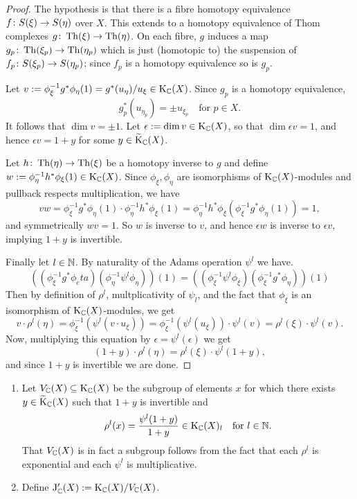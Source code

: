\begin{proof}
  The hypothesis is that there is a fibre homotopy equivalence $f \colon
  S(\xi) \to S(\eta)$ over $X$. This extends to a homotopy equivalence
  of Thom complexes $g \colon \operatorname{Th}(\xi) \to \operatorname{Th}(\eta)$. On each fibre, $g$
  induces a map $g_p \colon \operatorname{Th}(\xi_p) \to \operatorname{Th}(\eta_p)$ which is just
  (homotopic to) the suspension of $f_p \colon S(\xi_p) \to S(\eta_p)$;
  since $f_p$ is a homotopy equivalence so is $g_p$.

  Let $v \mathrel{:=} \phi_\xi^{-1}g^*\phi_\eta(1) = g^*(u_\eta)/u_\xi \in
  \mathrm{K}_{\mathbb{C}}(X)$. Since $g_p$ is a homotopy equivalence,
  \[
  g_p^*(u_{\eta_p}) = \pm u_{\xi_p} \quad \text{for }p \in X.
  \]
  It follows that $\dim v = \pm 1$. Let $\epsilon \mathrel{:=} \dim v \in
  \mathrm{K}_{\mathbb{C}}(X)$, so that $\dim \epsilon v = 1$, and hence $\epsilon v = 1
  + y$ for some $y \in \widetilde{\mathrm{K}}_{\mathbb{C}}(X)$.

  Let $h \colon \operatorname{Th}(\eta) \to \operatorname{Th}(\xi)$ be a homotopy inverse to $g$ and
  define $w \mathrel{:=} \phi_\eta^{-1}h^*\phi_\xi(1) \in \mathrm{K}_{\mathbb{C}}(X)$. Since
  $\phi_\xi,\phi_\eta$ are isomorphisms of $\mathrm{K}_{\mathbb{C}}(X)$-modules and
  pullback respects multiplication, we have
  \[
  vw = \phi_\xi^{-1}g^*\phi_\eta(1) \cdot
  \phi_\eta^{-1}h^*\phi_\xi(1) =
  \phi_\eta^{-1}h^*\phi_\xi(\phi_\xi^{-1}g^*\phi_\eta(1)) = 1,
  \]
  and symmetrically $wv = 1$. So $w$ is inverse to $v$, and hence
  $\epsilon w$ is inverse to $\epsilon v$, implying $1+y$ is
  invertible.

  Finally let $l \in \mathbb{N}$. By naturality of the Adams operation
  $\psi^l$ we have.
  \[
  ((\phi_\xi^{-1}g^*\phi_eta)(\phi_\eta^{-1}\psi^l\phi_\eta))(1) =
  ((\phi_\xi^{-1}\psi^l\phi_\xi)(\phi_\xi^{-1}g^*\phi_\eta))(1)
  \]
  Then by definition of $\rho^l$, multplicativity of $\psi_l$, and the
  fact that $\phi_\xi$ is an isomorphism of $\mathrm{K}_{\mathbb{C}}(X)$-modules, we get
  \[
  v \cdot \rho^l(\eta) = \phi_\xi^{-1}(\psi^l(v \cdot u_\xi)) =
  \phi_\xi^{-1}(\psi^l(u_\xi)) \cdot \psi^l(v) = \rho^l(\xi) \cdot
  \psi^l(v).
  \]
  Now, multiplying this equation by $\epsilon = \psi^l(\epsilon)$ we
  get
  \[
  (1+y) \cdot \rho^l(\eta) = \rho^l(\xi) \cdot \psi^l(1+y),
  \]
  and since $1+y$ is invertible we are done.
\end{proof}

\begin{definitions}
  \label{jprime}
  \begin{enumerate}[leftmargin=*]
  \item Let $V_{\mathbb{C}}(X) \subseteq \mathrm{K}_{\mathbb{C}}(X)$ be the subgroup of elements
    $x$ for which there exists $y \in \widetilde{\mathrm{K}}_{\mathbb{C}}(X)$ such that $1+y$ is
    invertible and
    \begin{equation}
      \label{jprime-y}
      \rho^l(x) = \frac{\psi^l(1+y)}{1+y} \in \mathrm{K}_{\mathbb{C}}(X)_l \quad \text{for
      } l \in \mathbb{N}.
    \end{equation}
    That $V_{\mathbb{C}}(X)$ is in fact a subgroup
    follows from the fact that each $\rho^l$ is exponential and each
    $\psi^l$ is multiplicative.
  \item Define $\mathrm{J}_{\mathbb{C}}'(X) \mathrel{:=} \mathrm{K}_{\mathbb{C}}(X)/V_{\mathbb{C}}(X)$.
  \end{enumerate}
\end{definitions}

